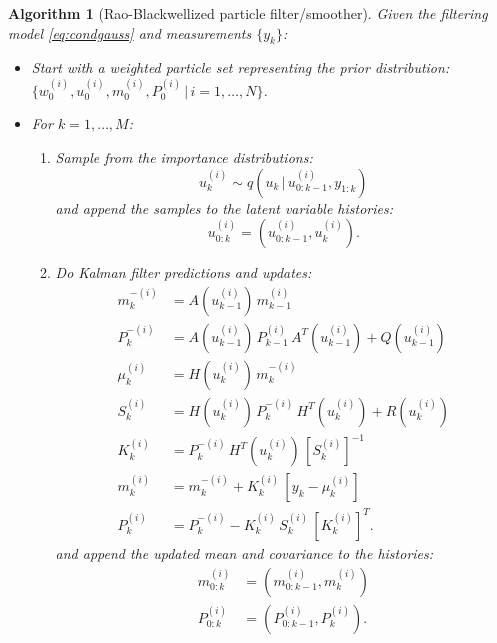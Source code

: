 \documentclass[twocolumn]{autart}    %
\newtheorem{algo}{Algorithm}[section]
\begin{document}
\begin{algo}[Rao-Blackwellized particle filter/smoother] \label{eq:rbpfs}
  Given the filtering model \eqref{eq:condgauss} and
  measurements $\{y_k\}$:
\begin{itemize}
\item Start with a weighted particle set representing the prior
  distribution: $\{ w_0^{(i)}, u_0^{(i)}, m_0^{(i)}, P_0^{(i)} \,|\,i=1,\ldots,N \}$.
\item For $k=1,\ldots,M$:
\begin{enumerate}
\item Sample from the importance distributions:
  \begin{equation}
     u_k^{(i)} \sim q(u_{k} \, | \, u_{0:k-1}^{(i)},y_{1:k})
  \end{equation}
%
  and append the samples to the latent variable histories:
%
  \begin{equation}
     u_{0:k}^{(i)} = (u_{0:k-1}^{(i)},u_k^{(i)}).
  \end{equation}

\item Do Kalman filter predictions and updates:
%
  \begin{equation}
  \begin{split}
    m_k^{-(i)} &= A(u_{k-1}^{(i)}) \, m_{k-1}^{(i)} \\
    P_k^{-(i)} &= A(u_{k-1}^{(i)}) \, P_{k-1}^{(i)} \, A^T(u_{k-1}^{(i)})
                + Q(u_{k-1}^{(i)}) \\
   \mu_k^{(i)} &= H(u_{k}^{(i)}) \, m_k^{-(i)} \\
     S_k^{(i)} &= H(u_{k}^{(i)}) \, P_{k}^{-(i)} \, H^T(u_{k}^{(i)})
                + R(u_{k}^{(i)}) \\
     K_k^{(i)} &= P_{k}^{-(i)} \, H^T(u_{k}^{(i)}) \, [S_k^{(i)}]^{-1} \\
     m_k^{(i)} &= m_k^{-(i)} + K_k^{(i)} \, [y_k - \mu_k^{(i)}] \\
     P_k^{(i)} &= P_{k}^{-(i)} - K_k^{(i)} \, S_k^{(i)} \, [K_k^{(i)}]^T.
  \end{split}
  \end{equation}
%
  and append the updated mean and covariance to the histories:
%
  \begin{equation}
  \begin{split}
     m_{0:k}^{(i)} &= (m_{0:k-1}^{(i)},m_k^{(i)}) \\
     P_{0:k}^{(i)} &= (P_{0:k-1}^{(i)},P_k^{(i)}).
  \end{split}
  \end{equation}


\end{enumerate}
\end{itemize}
\end{algo}
\end{document}
